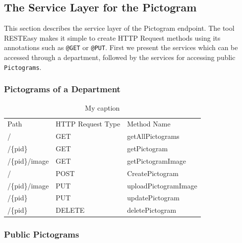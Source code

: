 \subsection{The Service Layer for the Pictogram}
This section describes the service layer of the Pictogram endpoint.
The tool RESTEasy makes it simple to create HTTP Request methods using its annotations such as \texttt{@GET} or \texttt{@PUT}.
First we present the services which can be accessed through a department, followed by the services for accessing public \texttt{Pictograms}.

\subsubsection*{Pictograms of a Department}

\begin{table}[]
\centering
\caption{My caption}
\label{my-label}
\begin{tabular}{lll}
Path           & HTTP Request Type & Method Name          \\
/              & GET               & getAllPictograms     \\
/\{pid\}       & GET               & getPictogram         \\
/\{pid\}/image & GET               & getPictogramImage    \\
/              & POST              & CreatePictogram      \\
/\{pid\}/image & PUT               & uploadPictogramImage \\
/\{pid\}       & PUT               & updatePictogram      \\
/\{pid\}	   & DELETE			   & deletePictogram	  \\
\end{tabular}
\end{table}

\subsubsection*{Public Pictograms}